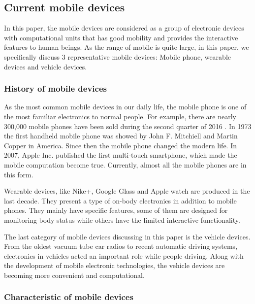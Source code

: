 \documentclass[article]{aaltoseries}
\begin{document}


\subsection{Current mobile devices} %

In this paper, the mobile devices are considered as a group of electronic devices with
computational units that has good mobility and provides the interactive features to human beings.
As the range of mobile is quite large, in this paper, we specifically discuss 3 representative 
mobile devices: Mobile phone, wearable devices and vehicle devices.




\subsubsection{History of mobile devices}

As the most common mobile devices in our daily life, the mobile phone is one of the most familiar 
electronics to normal people. For example, there are nearly 300,000 mobile phones have been 
sold during the second quarter of 2016 \cite{moblePhoneSale}. In 1973 the first handheld mobile phone
was showed by John F. Mitchiell and Martin Copper in America. Since then the mobile phone 
changed the modern life. In 2007, Apple Inc. published the first multi-touch smartphone,
 which made the mobile computation become true.
  Currently, almost all the mobile phones are in this form. 


Wearable devices, like Nike+, Google Glass and Apple watch are produced in the last decade. They present
a type of on-body electronics in addition to mobile phones. They mainly have specific features, some of them
are designed for monitoring body status while others have the limited interactive functionality.

The last category of mobile devices discussing in this paper is the vehicle devices. From the oldest vacuum tube
car radios to recent automatic driving systems, electronics in vehicles acted an important role while people
driving. Along with the development of mobile electronic technologies, the vehicle devices are becoming more convenient
and computational.



\subsubsection{Characteristic of mobile devices}
\end{document}
